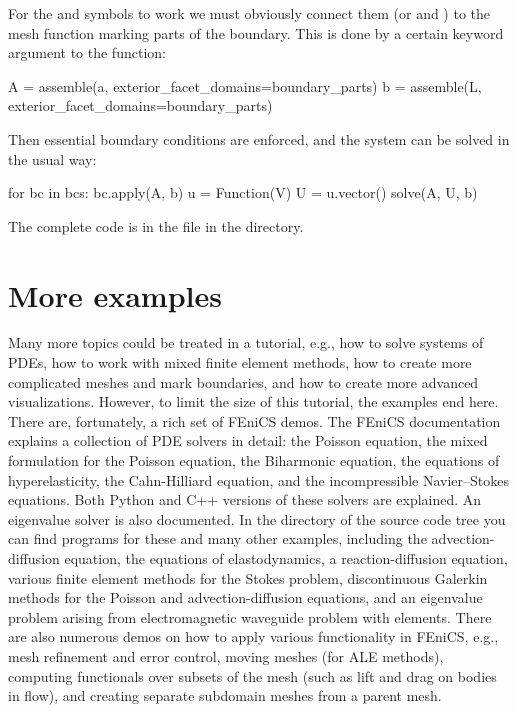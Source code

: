 \clearpage

\noindent
For the  and  symbols to work we must obviously
connect them (or  and ) to the mesh function marking
parts of the boundary. This is done by a certain keyword argument to
the  function:

\begin{python}
A = assemble(a, exterior_facet_domains=boundary_parts)
b = assemble(L, exterior_facet_domains=boundary_parts)
\end{python}
Then essential boundary conditions are enforced, and the system can be
solved in the usual way:
\begin{python}
for bc in bcs: bc.apply(A, b)
u = Function(V)
U = u.vector()
solve(A, U, b)
\end{python}
The complete code is in the  file in the
 directory.

\section{More examples}

Many more topics could be treated in a \fenics{} tutorial, e.g., how
to solve systems of PDEs, how to work with mixed finite element
methods, how to create more complicated meshes and mark boundaries,
and how to create more advanced visualizations.  However, to limit the
size of this tutorial, the examples end here.  There are, fortunately,
a rich set of FEniCS demos.  The FEniCS documentation explains a
collection of PDE solvers in detail: the Poisson equation, the mixed
formulation for the Poisson equation, the Biharmonic equation, the
equations of hyperelasticity, the Cahn-Hilliard equation, and the
incompressible Navier--Stokes equations.  Both Python and C++ versions
of these solvers are explained.  An eigenvalue solver is also
documented.  In the  directory of the \dolfin{} source
code tree you can find programs for these and many other examples,
including the advection-diffusion equation, the equations of
elastodynamics, a reaction-diffusion equation, various finite element
methods for the Stokes problem, discontinuous Galerkin methods for the
Poisson and advection-diffusion equations, and an eigenvalue problem
arising from electromagnetic waveguide problem with \nedelec{}
elements.  There are also numerous demos on how to apply various
functionality in FEniCS, e.g., mesh refinement and error control,
moving meshes (for ALE methods), computing functionals over subsets of
the mesh (such as lift and drag on bodies in flow), and creating
separate subdomain meshes from a parent mesh.

